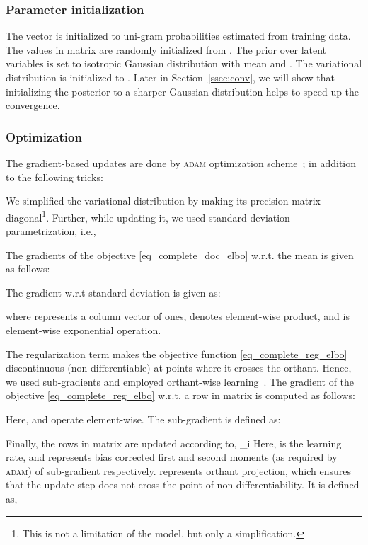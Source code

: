\documentclass[journal]{IEEEtran}
\newcommand{\mb}[1]{\bm{#1}}
\begin{document}
\subsubsection{Parameter initialization}
\label{ssec:param_init}
The vector  is initialized to  uni-gram probabilities
estimated from  training data. The values in matrix  are randomly 
initialized from . The prior over latent variables 
 is set to isotropic Gaussian distribution with mean 
and .
The variational distribution  is initialized to 
. Later in Section~\ref{ssec:conv}, 
we will show that initializing the posterior to a sharper Gaussian distribution 
helps to speed up the convergence.


\subsubsection{Optimization}
\label{ssec:optim}
The gradient-based updates are done by \textsc{adam} optimization scheme~\cite{Kingma:2014:Adam}; in addition to the following tricks:

We simplified the variational distribution  by making its 
precision matrix  diagonal\footnote{This is not a limitation of 
the model, but only a simplification.}. Further, while 
updating it, we used  
standard deviation parametrization, i.e.,

The gradients of the objective \eqref{eq_complete_doc_elbo} w.r.t. the mean 
 is given as follows:

The gradient w.r.t  standard deviation  is given as:

where  represents a column vector of ones,  denotes 
element-wise product, and  is element-wise exponential operation.


The  regularization term makes the objective function 
\eqref{eq_complete_reg_elbo} discontinuous (non-differentiable) at points 
where it crosses the orthant. Hence, we used sub-gradients and employed 
orthant-wise learning~\cite{Andrew:2007:L1}. The gradient of the objective 
\eqref{eq_complete_reg_elbo} w.r.t. a row  in matrix  is 
computed as follows:

Here,  and  operate element-wise. The sub-gradient  is defined as:

Finally, the rows in matrix  are updated according to,
\mb{d}_i
Here,  is the learning rate,  and  represents 
bias corrected first and second moments (as required by \textsc{adam}) of 
sub-gradient  respectively.
 represents orthant projection, which ensures that the 
update step does not cross the point of non-differentiability. It is defined as,
\end{document}
